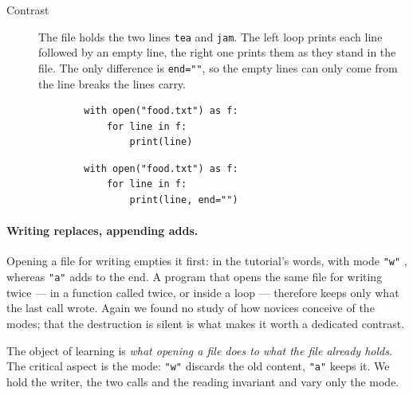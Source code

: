 \begin{description}
  \item[Contrast] The file holds the two lines \texttt{tea} and
    \texttt{jam}.
    The left loop prints each line followed by an empty line, the right one
    prints them as they stand in the file.
    The only difference is \texttt{end=""}, so the empty lines
    can only come from the line breaks the lines carry.

    \hfill
    \begin{minipage}[t]{0.45\columnwidth}
      \begin{verbatim}
        with open("food.txt") as f:
            for line in f:
                print(line)
      \end{verbatim}
    \end{minipage}
    \hfill
    \begin{minipage}[t]{0.45\columnwidth}
      \begin{verbatim}
        with open("food.txt") as f:
            for line in f:
                print(line, end="")
      \end{verbatim}
    \end{minipage}
\end{description}

\paragraph{Writing replaces, appending adds.}
Opening a file for writing empties it first: in the tutorial's words, with
mode \texttt{"w"} , whereas \texttt{"a"}
adds to the end.
A program that opens the same file for writing twice --- in a function
called twice, or inside a loop --- therefore keeps only what the last call
wrote.
Again we found no study of how novices conceive of the modes; that the
destruction is silent is what makes it worth a dedicated contrast.

The object of learning is \emph{what opening a file does to what the file
already holds}.
The critical aspect is the mode: \texttt{"w"} discards the old
content, \texttt{"a"} keeps it.
We hold the writer, the two calls and the reading invariant and vary only
the mode.

